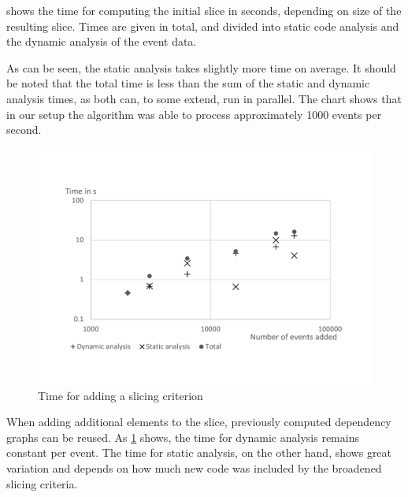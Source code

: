 ﻿\documentclass[
      english,
			conference,
      ]{IEEEtran}
\begin{document}
 shows the time for computing the initial slice in seconds, depending on size of the resulting slice.
Times are given in total, and divided into static code analysis and the dynamic analysis of the event data.

As can be seen, the static analysis takes slightly more time on average.
It should be noted that the total time is less than the sum of the static and dynamic analysis times, as both can, to some extend, run in parallel.
The chart shows that in our setup the algorithm was able to process approximately 1000 events per second.

\begin{figure}
	\centering
		\includegraphics[width=\linewidth, clip, trim={20mm 26mm 20mm 26mm}]{chart-add.pdf}
	\caption{Time for adding a slicing criterion}
	\label{fig:chartadd}
\end{figure}

When adding additional elements to the slice, previously computed dependency graphs can be reused.
As \cref{fig:chartadd} shows, the time for dynamic analysis remains constant per event.
The time for static analysis, on the other hand, shows great variation and depends on how much new code was included by the broadened slicing criteria.
\end{document}
